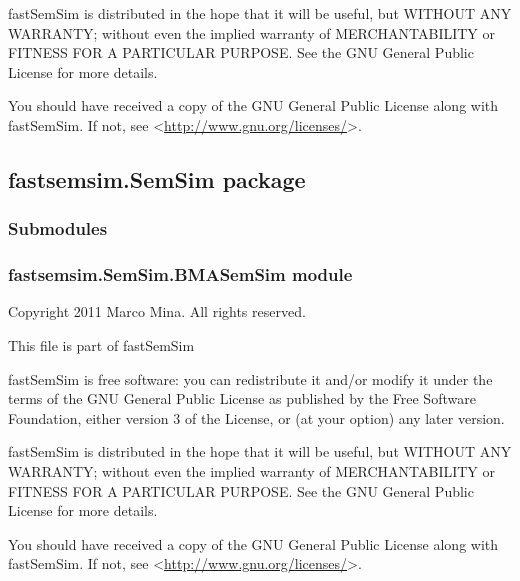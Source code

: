 \documentclass[letterpaper,10pt,english]{sphinxmanual}
\begin{document}
fastSemSim is distributed in the hope that it will be useful,
but WITHOUT ANY WARRANTY; without even the implied warranty of
MERCHANTABILITY or FITNESS FOR A PARTICULAR PURPOSE.  See the
GNU General Public License for more details.

You should have received a copy of the GNU General Public License
along with fastSemSim.  If not, see \textless{}\href{http://www.gnu.org/licenses/}{http://www.gnu.org/licenses/}\textgreater{}.


\subsection{fastsemsim.SemSim package}
\label{fastsemsim.SemSim::doc}\label{fastsemsim.SemSim:fastsemsim-semsim-package}

\subsubsection{Submodules}
\label{fastsemsim.SemSim:submodules}

\subsubsection{fastsemsim.SemSim.BMASemSim module}
\label{fastsemsim.SemSim:fastsemsim-semsim-bmasemsim-module}\label{fastsemsim.SemSim:module-fastsemsim.SemSim.BMASemSim}
Copyright 2011 Marco Mina. All rights reserved.

This file is part of fastSemSim

fastSemSim is free software: you can redistribute it and/or modify
it under the terms of the GNU General Public License as published by
the Free Software Foundation, either version 3 of the License, or
(at your option) any later version.

fastSemSim is distributed in the hope that it will be useful,
but WITHOUT ANY WARRANTY; without even the implied warranty of
MERCHANTABILITY or FITNESS FOR A PARTICULAR PURPOSE.  See the
GNU General Public License for more details.

You should have received a copy of the GNU General Public License
along with fastSemSim.  If not, see \textless{}\href{http://www.gnu.org/licenses/}{http://www.gnu.org/licenses/}\textgreater{}.
\end{document}
